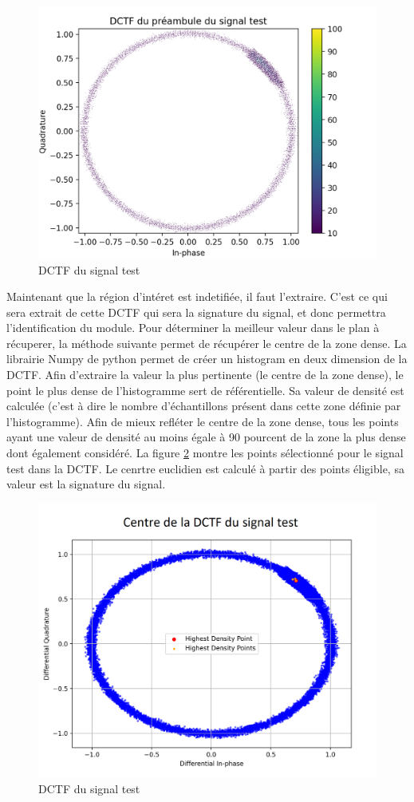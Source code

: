 \begin{figure}[h]
\centering

\includegraphics[scale=0.18]{images/dctf5.png}
\caption{DCTF du signal test}\label{term318}
\end{figure}

Maintenant que la région d'intéret est indetifiée, il faut l'extraire. C'est ce qui sera extrait de cette DCTF qui sera la signature du signal, et donc permettra l'identification du module. Pour déterminer la meilleur valeur dans le plan à récuperer, la méthode suivante permet de récupérer le centre de la zone dense. La librairie Numpy de python permet de créer un histogram en deux dimension de la DCTF. Afin d'extraire la valeur la plus pertinente (le centre de la zone dense), le point le plus dense de l'histogramme sert de référentielle. Sa valeur de densité est calculée (c'est à dire le nombre d'échantillons présent dans cette zone définie par l'histogramme). Afin de mieux refléter le centre de la zone dense, tous les points ayant une valeur de densité au moins égale à 90 pourcent de la zone la plus dense dont également considéré. La figure \ref{term319} montre les points sélectionné pour le signal test dans la DCTF. Le cenrtre euclidien est calculé à partir des points éligible, sa valeur est la signature du signal.


\begin{figure}[h]
\centering

\includegraphics[scale=0.18]{images/dctf6.png}
\caption{DCTF du signal test}\label{term319}
\end{figure}